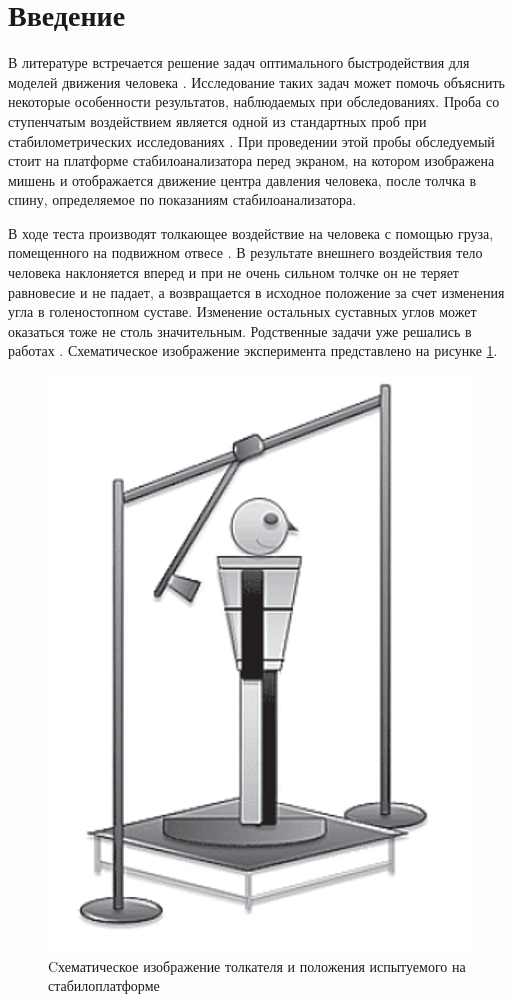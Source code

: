 \documentclass[a4paper,12pt, openany]{book}
\theoremstyle{plain} %
\theoremstyle{definition} %
\theoremstyle{remark} %
\numberwithin{equation}{chapter}
\begin{document}
\thispagestyle{empty} %
\normalsize{
\newpage

\tableofcontents

\newpage


\chapter*{Введение}
В литературе встречается решение задач оптимального быстродействия для моделей движения человека \cite{pandy,humanMovements}. Исследование таких задач может помочь объяснить некоторые особенности результатов, наблюдаемых при обследованиях.
Проба со ступенчатым воздействием является одной из стандартных проб
при стабилометрических исследованиях \cite{AdaptFizkult,stabilographTest}. При проведении этой пробы
обследуемый стоит на платформе стабилоанализатора перед экраном, на
котором изображена мишень и отображается движение центра давления
человека, после толчка в спину, определяемое по показаниям стабилоанализатора.

В ходе теста производят толкающее воздействие на человека с помощью груза, помещенного на подвижном отвесе \cite{pusher}. В результате внешнего
воздействия тело человека наклоняется вперед и при не очень сильном толчке
он не теряет равновесие и не падает, а возвращается в исходное
положение за счет изменения угла в голеностопном суставе. Изменение
остальных суставных углов может оказаться тоже не столь значительным.
Родственные задачи уже решались в работах \cite{PAKrychinin,kasatkin}.
Схематическое изображение эксперимента представлено на рисунке \ref{fig:pusher}.
\begin{figure}[h!]
    \centering
    \includegraphics[width=0.35\linewidth]{human.png}
    \caption{Cхематическое изображение толкателя и
        положения испытуемого на стабилоплатформе}
    \label{fig:pusher}
\end{figure}

}
\end{document}
